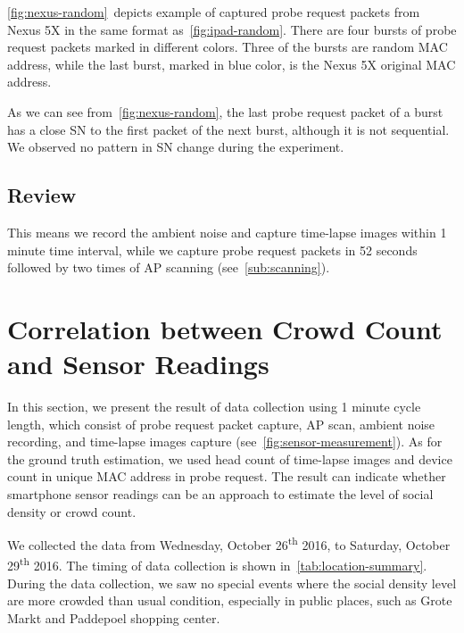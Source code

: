 	\autoref{fig:nexus-random}~depicts example of captured probe request packets from Nexus 5X in the same format as~\autoref{fig:ipad-random}. There are four bursts of probe request packets marked in different colors. Three of the bursts are random \ac{MAC} address, while the last burst, marked in blue color, is the Nexus 5X original \ac{MAC} address.

	As we can see from~\autoref{fig:nexus-random}, the last probe request packet of a burst has a close \ac{SN} to the first packet of the next burst, although it is not sequential. We observed no pattern in \ac{SN} change during the experiment.

	\subsection{Review} %
	\label{sub:review}
	This means we record the ambient noise and capture time-lapse images within 1 minute time interval, while we capture probe request packets in 52 seconds followed by two times of \ac{AP} scanning (see~\autoref{sub:scanning}).



\section{Correlation between Crowd Count and Sensor Readings} %
\label{sec:crowd_count_correlation-result}
In this section, we present the result of data collection using 1 minute cycle length, which consist of probe request packet capture, \ac{AP} scan, ambient noise recording, and time-lapse images capture (see~\autoref{fig:sensor-measurement}). As for the ground truth estimation, we used head count of time-lapse images and device count in unique \ac{MAC} address in probe request. The result can indicate whether smartphone sensor readings can be an approach to estimate the level of social density or crowd count.

We collected the data from Wednesday, October 26\textsuperscript{th} 2016, to Saturday, October 29\textsuperscript{th} 2016. The timing of data collection is shown in~\autoref{tab:location-summary}. During the data collection, we saw no special events where the social density level are more crowded than usual condition, especially in public places, such as Grote Markt and Paddepoel shopping center.

